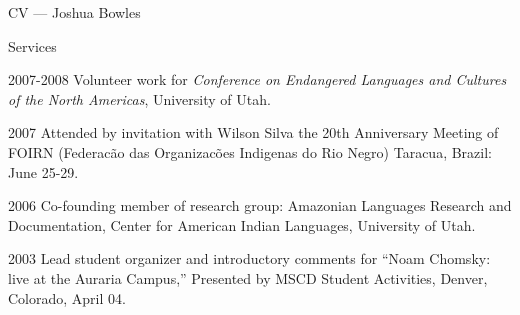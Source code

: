 \begin{cv}{CV --- Joshua Bowles}
\begin{cvlist}{Services}
\item[2007-2008] Volunteer work for \textsl{Conference on Endangered Languages and Cultures of the
North Americas}, University of Utah.
\item[2007] Attended by invitation with Wilson Silva the 20th Anniversary Meeting of FOIRN
(Federac\~ao das Organizac\~oes Indigenas do Rio Negro) Taracua, Brazil: June 25-29.  
\item[2006] Co-founding member of research group: Amazonian Languages Research and Documentation,
Center for American Indian Languages, University of Utah. 
\item[2003] Lead student organizer and introductory comments for ``Noam Chomsky: live at the Auraria
Campus,'' Presented by MSCD Student Activities, Denver, Colorado, April 04.
\end{cvlist}

\end{cv}

